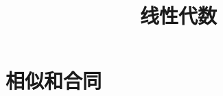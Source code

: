 \documentclass[aspectratio=169,handout]{ctexbeamer}
\title{线性代数}
\begin{document}
\setcounter{part}{2}
\part{相似和合同}



\end{document}
